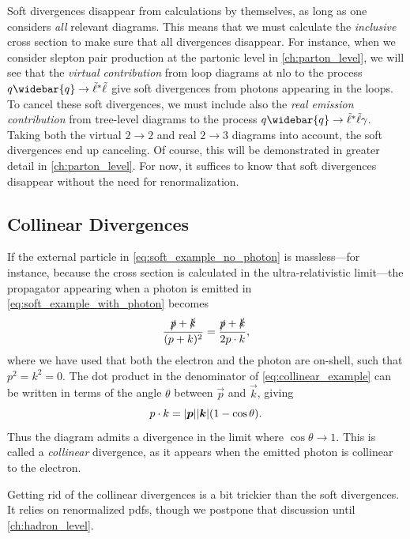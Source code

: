 Soft divergences disappear from calculations by themselves, as long as one considers \emph{all} relevant diagrams.
This means that we must calculate the \emph{inclusive} cross section to make sure that all divergences disappear.
For instance, when we consider slepton pair production at the partonic level in \cref{ch:parton_level}, we will see that the \emph{virtual contribution} from loop diagrams at \gls{nlo} to the process $q\widebar{q}\to\slepton^*\slepton$ give soft divergences from photons appearing in the loops.
To cancel these soft divergences, we must include also the \emph{real emission contribution} from tree-level diagrams to the process $q\widebar{q}\to\slepton^*\slepton\gamma$.
Taking both the virtual $2\to2$ and real $2\to3$ diagrams into account, the soft divergences end up canceling.
Of course, this will be demonstrated in greater detail in \cref{ch:parton_level}.
For now, it suffices to know that soft divergences disappear without the need for renormalization.


\subsection{Collinear Divergences}
If the external particle in \cref{eq:soft_example_no_photon} is massless---for instance, because the cross section is calculated in the ultra-relativistic limit---the propagator appearing when a photon is emitted in \cref{eq:soft_example_with_photon} becomes
\begin{equation}\label{eq:collinear_example}
    \frac{\slashed{p}+\slashed{k}}{(p+k)^2} = \frac{\slashed{p}+\slashed{k}}{2p\cdot k},
\end{equation}
where we have used that both the electron and the photon are on-shell, such that $p^2=k^2=0$.
The dot product in the denominator of \cref{eq:collinear_example} can be written in terms of the angle $\theta$ between $\vec{p}$ and $\vec{k}$, giving
\begin{equation}
    p\cdot k = \lvert\boldsymbol{p}\rvert\lvert\boldsymbol{k}\rvert (1 - \cos\theta).
\end{equation}
Thus the diagram admits a divergence in the limit where $\cos\theta\to1$.
This is called a \emph{collinear} divergence, as it appears when the emitted photon is collinear to the electron.

Getting rid of the collinear divergences is a bit trickier than the soft divergences. It relies on renormalized \glspl{pdf}, though we postpone that discussion until \cref{ch:hadron_level}.



